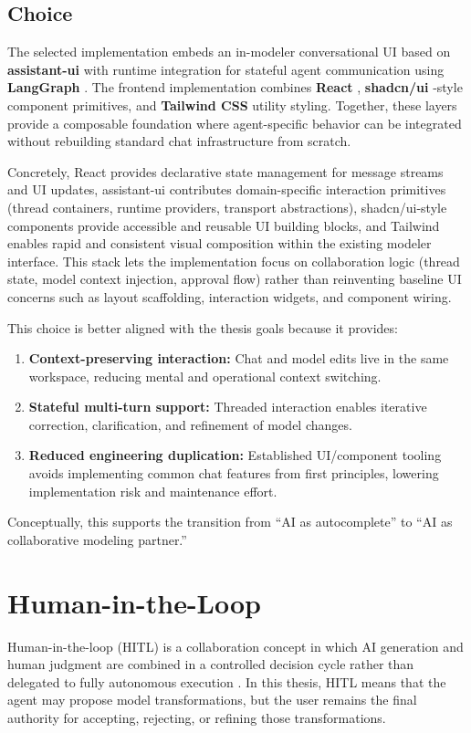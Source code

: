 \subsection{Choice}
The selected implementation embeds an in-modeler conversational UI based on \textbf{assistant-ui} with runtime integration for stateful agent communication using \textbf{LangGraph} \cite{assistantui, langchainLangGraph}. The frontend implementation combines \textbf{React} \cite{reactReact}, \textbf{shadcn/ui} \cite{shadcnFoundationYour}-style component primitives, and \textbf{Tailwind CSS} \cite{tailwindcssTailwindRapidly} utility styling. Together, these layers provide a composable foundation where agent-specific behavior can be integrated without rebuilding standard chat infrastructure from scratch.

Concretely, React provides declarative state management for message streams and UI updates, assistant-ui contributes domain-specific interaction primitives (thread containers, runtime providers, transport abstractions), shadcn/ui-style components provide accessible and reusable UI building blocks, and Tailwind enables rapid and consistent visual composition within the existing modeler interface. This stack lets the implementation focus on collaboration logic (thread state, model context injection, approval flow) rather than reinventing baseline UI concerns such as layout scaffolding, interaction widgets, and component wiring.

This choice is better aligned with the thesis goals because it provides:
\begin{enumerate}
    \item \textbf{Context-preserving interaction:} Chat and model edits live in the same workspace, reducing mental and operational context switching.
    \item \textbf{Stateful multi-turn support:} Threaded interaction enables iterative correction, clarification, and refinement of model changes.
    \item \textbf{Reduced engineering duplication:} Established UI/component tooling avoids implementing common chat features from first principles, lowering implementation risk and maintenance effort.
\end{enumerate}

Conceptually, this supports the transition from ``AI as autocomplete'' to ``AI as collaborative modeling partner.''

\section{Human-in-the-Loop}
Human-in-the-loop (HITL) is a collaboration concept in which AI generation and human judgment are combined in a controlled decision cycle rather than delegated to fully autonomous execution \cite{mozannar2025magenticuihumanintheloopagenticsystems, bellos2025effectivehumanintheloopassistiveai}. In this thesis, HITL means that the agent may propose model transformations, but the user remains the final authority for accepting, rejecting, or refining those transformations.

